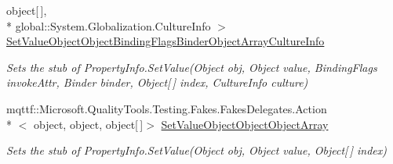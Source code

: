 \begin{DoxyCompactItemize}
object\mbox{[}$\,$\mbox{]}, \\*
global\-::\-System.\-Globalization.\-Culture\-Info $>$ \hyperlink{class_system_1_1_reflection_1_1_fakes_1_1_stub_property_info_aa38006f3f31b27298685608068aa5a64}{Set\-Value\-Object\-Object\-Binding\-Flags\-Binder\-Object\-Array\-Culture\-Info}
\begin{DoxyCompactList}\small\item\em Sets the stub of Property\-Info.\-Set\-Value(\-Object obj, Object value, Binding\-Flags invoke\-Attr, Binder binder, Object\mbox{[}$\,$\mbox{]} index, Culture\-Info culture)\end{DoxyCompactList}\item 
mqttf\-::\-Microsoft.\-Quality\-Tools.\-Testing.\-Fakes.\-Fakes\-Delegates.\-Action\\*
$<$ object, object, object\mbox{[}$\,$\mbox{]}$>$ \hyperlink{class_system_1_1_reflection_1_1_fakes_1_1_stub_property_info_acba8d139d8960fbb394e39d1546bae4f}{Set\-Value\-Object\-Object\-Object\-Array}
\begin{DoxyCompactList}\small\item\em Sets the stub of Property\-Info.\-Set\-Value(\-Object obj, Object value, Object\mbox{[}$\,$\mbox{]} index)\end{DoxyCompactList}\end{DoxyCompactItemize}
